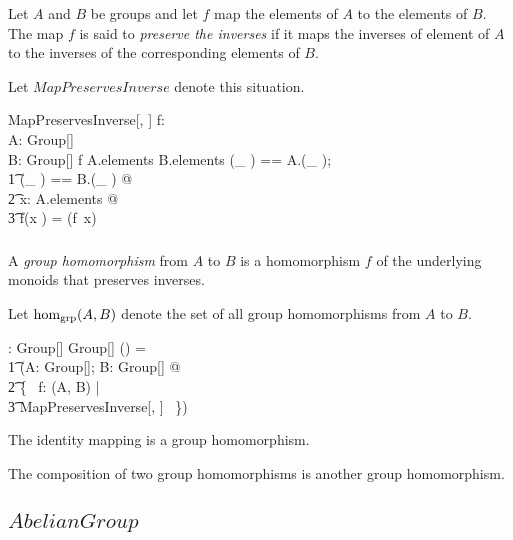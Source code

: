 \documentclass[12pt]{article}
\begin{document}
Let $A$ and $B$ be groups and let $f$ map the elements of $A$ to the elements of $B$.
The map $f$ is said to {\em preserve the inverses} if it maps the inverses of element of $A$
to the inverses of the corresponding elements of $B$.

Let $MapPreservesInverse$ denote this situation.

\begin{schema}{MapPreservesInverse}[\genT, \genU]
f: \genT \pfun \genU \\
A: Group[\genT] \\
B: Group[\genU]
\where
f \in A.elements \fun B.elements
\also
\LET (\_ \invG) == A.(\_ \invG); \\
\t1	(\_ \daggerG) == B.(\_ \invG) @ \\
\t2		\forall x: A.elements @ \\
\t3			f(x \invG) = (f~x) \daggerG
\end{schema}

\subsubsection{}

A {\em group homomorphism} from $A$ to $B$ is a homomorphism $f$ of the underlying monoids
that preserves inverses.

Let $\operatorname{hom_{grp}}(A, B)$ denote the set of all group homomorphisms from $A$ to $B$.

\begin{gendef}[\genT, \genU]
\HomGroup: Group[\genT] \cross Group[\genU] \fun \power (\genT \pfun \genU)
\where
\HomGroup = \\
\t1	(\lambda A: Group[\genT]; B: Group[\genU] @ \\
\t2		\{~ f: \HomMonoid(\GroupMonoid A, \GroupMonoid B) | \\
\t3			MapPreservesInverse[\genT, \genU] ~\})
\end{gendef}

\begin{remark}
The identity mapping is a group homomorphism.
\end{remark}

\begin{remark}
The composition of two group homomorphisms is another group homomorphism.
\end{remark}

\subsection{$AbelianGroup$}
\end{document}
